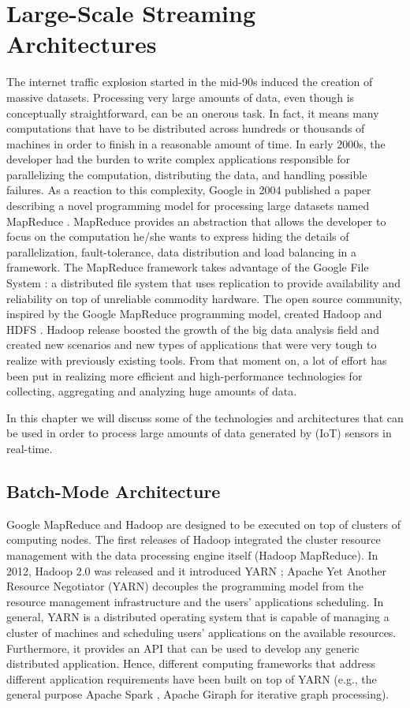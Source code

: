 \chapter{Large-Scale Streaming Architectures}
The internet traffic explosion started in the mid-90s induced the creation of massive datasets. Processing very large amounts of data, even though is conceptually straightforward, can be an onerous task. In fact, it means many computations that have to be distributed across hundreds or thousands of machines in order to finish in a reasonable amount of time. In early 2000s, the developer had the burden to write complex applications responsible for parallelizing the computation, distributing the data, and handling possible failures. As a reaction to this complexity, Google in 2004 published a paper describing a novel programming model for processing large datasets named MapReduce \cite{googlemapreduce}. MapReduce provides an abstraction that allows the developer to focus on the computation he/she wants to express hiding the details of parallelization, fault-tolerance, data distribution and load balancing in a framework. The MapReduce framework takes advantage of the Google File System \cite{googlefilesystem}: a distributed file system that uses replication to provide availability and reliability on top of unreliable commodity hardware. The open source community, inspired by the Google MapReduce programming model, created Hadoop \cite{hadooponline} and HDFS \cite{hadoophdfs}. Hadoop release boosted the growth of the big data analysis field and created new scenarios and new types of applications that were very tough to realize with previously existing tools. From that moment on, a lot of effort has been put in realizing more efficient and high-performance technologies for collecting, aggregating and analyzing huge amounts of data.

In this chapter we will discuss some of the technologies and architectures that can be used in order to process large amounts of data generated by (IoT) sensors in real-time.

\section{Batch-Mode Architecture}
Google MapReduce and Hadoop are designed to be executed on top of clusters of computing nodes. The first releases of Hadoop integrated the cluster resource management with the data processing engine itself (Hadoop MapReduce). In 2012, Hadoop 2.0 was released \cite{hadooponline} and it introduced YARN \cite{yarn}; Apache Yet Another Resource Negotiator (YARN) decouples the programming model from the resource management infrastructure and the users' applications scheduling. In general, YARN is a distributed operating system that is capable of managing a cluster of machines and scheduling users' applications on the available resources. Furthermore, it provides an API that can be used to develop any generic distributed application. Hence, different computing frameworks that address different application requirements have been built on top of YARN (e.g., the general purpose Apache Spark \cite{apachesparkonline}, Apache Giraph \cite{apachegiraphonline} for iterative graph processing). 

